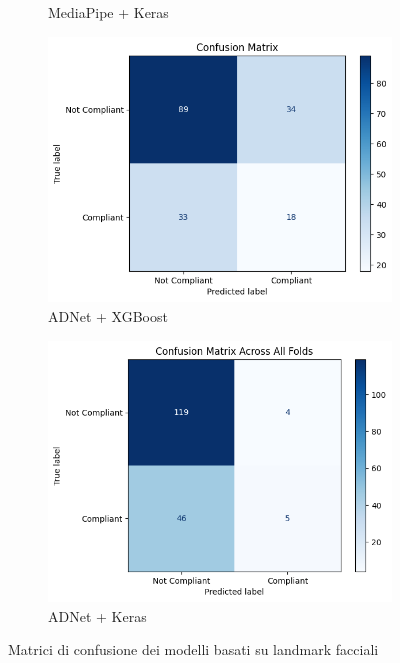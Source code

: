 \documentclass[12pt,a4paper,openright,twoside]{book}
\begin{document}
\begin{figure}[htbp]
\begin{subfigure}{0.45\textwidth}
        \caption{MediaPipe + Keras}
        \label{fig:mediapipe_keras_confusion_matrix}
    \end{subfigure}
    \begin{subfigure}{0.45\textwidth}
        \centering
        \includegraphics[width=\linewidth]{figures/adnet_xgboost_confusion_matrix.png}
        \caption{ADNet + XGBoost}
        \label{fig:adnet_xgboost_confusion_matrix}
    \end{subfigure}
    \hfill
    \begin{subfigure}{0.45\textwidth}
        \centering
        \includegraphics[width=\linewidth]{figures/adnet_keras_confusion_matrix.png}
        \caption{ADNet + Keras}
        \label{fig:adnet_keras_confusion_matrix}
    \end{subfigure}
    \caption{Matrici di confusione dei modelli basati su landmark facciali}
\end{figure}
\end{document}
